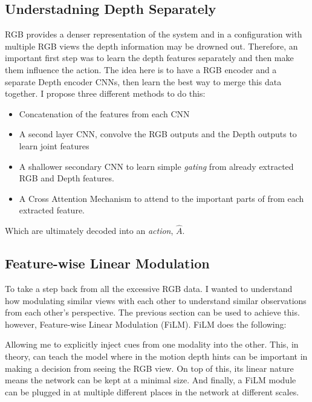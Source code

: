\subsection{Understadning Depth Separately}\label{subsec:policies-understand-depth-sep}
RGB provides a denser representation of the system and in a configuration with multiple RGB views the depth information may be drowned out. Therefore, an important first step was to learn the depth features separately and then make them influence the action. The idea here is to have a RGB encoder and a separate Depth encoder CNNs, then learn the best way to merge this data together. I propose three different methods to do this:

\begin{itemize}
  \item Concatenation of the features from each CNN 
  \item A second layer CNN, convolve the RGB outputs and the Depth outputs to learn joint features 
  \item A shallower secondary CNN to learn simple \emph{gating} from already extracted RGB and Depth features. 
  \item A Cross Attention Mechanism to attend to the important parts of from each extracted feature.
\end{itemize}
Which are ultimately decoded into an \emph{action}, $\hat{A}$.

\subsection{Feature-wise Linear Modulation}
To take a step back from all the excessive RGB data. I wanted to understand how modulating similar views with each other to understand similar observations from each other's perspective. The previous section can be used to achieve this. however, Feature-wise Linear Modulation (FiLM). FiLM does the following: 


Allowing me to explicitly inject cues from one modality into the other. This, in theory, can teach the model where in the motion depth hints can be important in making a decision from seeing the RGB view. On top of this, its linear nature means the network can be kept at a minimal size. And finally, a FiLM module can be plugged in at multiple different places in the network at different scales. 

